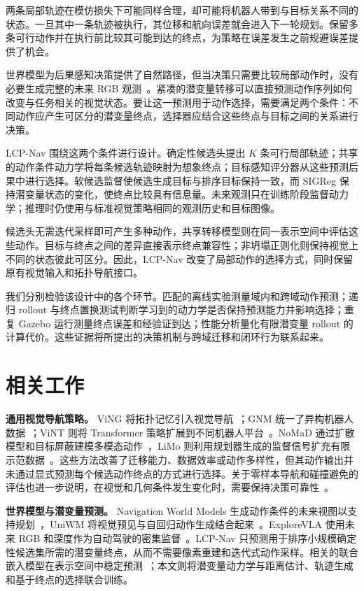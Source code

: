 \documentclass[conference]{IEEEtran}
\begin{document}
两条局部轨迹在模仿损失下可能同样合理，却可能将机器人带到与目标关系不同的状态。一旦其中一条轨迹被执行，其位移和航向误差就会进入下一轮规划。保留多条可行动作并在执行前比较其可能到达的终点，为策略在误差发生之前规避误差提供了机会。

世界模型为后果感知决策提供了自然路径，但当决策只需要比较局部动作时，没有必要生成完整的未来 RGB 观测~\cite{nwm,uniwm}。紧凑的潜变量转移可以直接预测动作序列如何改变与任务相关的视觉状态。要让这一预测用于动作选择，需要满足两个条件：不同动作应产生可区分的潜变量终点，选择器应结合这些终点与目标之间的关系进行决策。

LCP-Nav 围绕这两个条件进行设计。确定性候选头提出 $K$ 条可行局部轨迹；共享的动作条件动力学将每条候选轨迹映射为想象终点；目标感知评分器从这些预测后果中进行选择。软候选监督使候选生成目标与排序目标保持一致，而 SIGReg 保持潜变量状态的变化，使终点比较具有信息量。未来观测只在训练阶段监督动力学；推理时仍使用与标准视觉策略相同的观测历史和目标图像。

候选头无需迭代采样即可产生多种动作，共享转移模型则在同一表示空间中评估这些动作。目标与终点之间的差异直接表示终点兼容性；非坍塌正则化则保持视觉上不同的状态彼此可区分。因此，LCP-Nav 改变了局部动作的选择方式，同时保留原有视觉输入和拓扑导航接口。

我们分别检验该设计中的各个环节。匹配的离线实验测量域内和跨域动作预测；递归 rollout 与终点置换测试判断学习到的动力学是否保持预测能力并影响选择；重复 Gazebo 运行测量终点误差和经验证到达；性能分析量化有限潜变量 rollout 的计算代价。这些证据将所提出的决策机制与跨域迁移和闭环行为联系起来。

\section{相关工作}

\textbf{通用视觉导航策略。} ViNG 将拓扑记忆引入视觉导航~\cite{ving}；GNM 统一了异构机器人数据~\cite{gnm}；ViNT 则将 Transformer 策略扩展到不同机器人平台~\cite{vint}。NoMaD 通过扩散模型和目标屏蔽建模多模态动作~\cite{nomad}，LiMo 则利用规划器生成的监督信号扩充有限示范数据~\cite{limo}。这些方法改善了迁移能力、数据效率或动作多样性，但其动作输出并未通过显式预测每个候选动作终点的方式进行选择。关于零样本导航和碰撞避免的评估也进一步说明，在视觉和几何条件发生变化时，需要保持决策可靠性~\cite{vfm-eval,care}。

\textbf{世界模型与潜变量预测。} Navigation World Models 生成动作条件的未来视图以支持规划~\cite{nwm}，UniWM 将视觉预见与自回归动作生成结合起来~\cite{uniwm}。ExploreVLA 使用未来 RGB 和深度作为自动驾驶的密集监督~\cite{explorevla}。LCP-Nav 只预测用于排序小规模确定性候选集所需的潜变量终点，从而不需要像素重建和迭代式动作采样。相关的联合嵌入模型在表示空间中稳定预测~\cite{lewm}；本文则将潜变量动力学与距离估计、轨迹生成和基于终点的选择联合训练。
\end{document}
